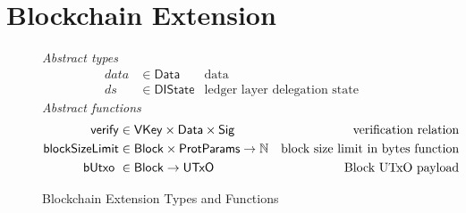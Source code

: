 \documentclass[11pt,a4paper]{article}
\newcommand{\var}[1]{\mathit{#1}}
\newcommand{\fun}[1]{\mathsf{#1}}
\newcommand{\type}[1]{\mathsf{#1}}
\newcommand{\Block}{\type{Block}}
\newcommand{\VKey}{\type{VKey}}
\newcommand{\Sig}{\type{Sig}}
\newcommand{\Data}{\type{Data}}
\newcommand{\DelegState}{\type{DIState}}
\newcommand{\ProtParams}{\type{ProtParams}} %
\newcommand{\verifyname}{verify}
\newcommand{\blocksizelimitname}{blockSizeLimit}
\newcommand{\totalf}{\to}
\begin{document}
\clearpage

\section{Blockchain Extension}
\label{sec:chain-extension}

\newcommand{\CEEnv}{\type{CEEnv}}
\newcommand{\CEState}{\type{CEState}}

\newcommand{\butxo}[1]{\fun{bUtxo}\ #1}

\newcommand{\UTxO}{\type{UTxO}}
\newcommand{\DIEnv}{\type{DIEnv}}
\newcommand{\DIState}{\type{DIState}}

\newcommand{\UPIEnv}{\type{UPIEnv}}
\newcommand{\UPIState}{\type{UPIState}}

\begin{figure}[ht]
  \emph{Abstract types}
  \begin{align*}
    \var{data} & \in \Data    & \text{data}\\
    \var{ds} & \in \DelegState & \text{ledger layer delegation state}
  \end{align*}
  \emph{Abstract functions}
  \begin{align*}
    \fun{\verifyname} & \in \VKey \times \Data \times \Sig
      & \text{verification relation} \\
    \fun{\blocksizelimitname} & \in \Block \times \ProtParams \totalf \mathbb{N}
      & \text{block size limit in bytes function} \\
    \butxo & \in \Block \totalf \UTxO & \text{Block UTxO payload}
  \end{align*}
  \caption{Blockchain Extension Types and Functions}
  \label{fig:defs:chain-extension}
\end{figure}
\end{document}
